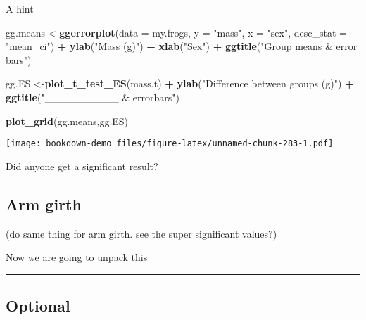 \documentclass[]{book}
\newenvironment{Shaded}{\begin{snugshade}}{\end{snugshade}}
\newcommand{\KeywordTok}[1]{\textcolor[rgb]{0.13,0.29,0.53}{\textbf{#1}}}
\newcommand{\DataTypeTok}[1]{\textcolor[rgb]{0.13,0.29,0.53}{#1}}
\newcommand{\StringTok}[1]{\textcolor[rgb]{0.31,0.60,0.02}{#1}}
\newcommand{\OperatorTok}[1]{\textcolor[rgb]{0.81,0.36,0.00}{\textbf{#1}}}
\newcommand{\NormalTok}[1]{#1}
\theoremstyle{definition}
\theoremstyle{definition}
\theoremstyle{definition}
\theoremstyle{remark}
\begin{document}
A hint

\begin{Shaded}
\begin{Highlighting}[]
\NormalTok{gg.means <-}\KeywordTok{ggerrorplot}\NormalTok{(}\DataTypeTok{data =}\NormalTok{ my.frogs,}
          \DataTypeTok{y =} \StringTok{"mass"}\NormalTok{,}
          \DataTypeTok{x =} \StringTok{"sex"}\NormalTok{,}
          \DataTypeTok{desc_stat =} \StringTok{"mean_ci"}\NormalTok{) }\OperatorTok{+}
\StringTok{  }\KeywordTok{ylab}\NormalTok{(}\StringTok{"Mass (g)"}\NormalTok{) }\OperatorTok{+}
\StringTok{  }\KeywordTok{xlab}\NormalTok{(}\StringTok{"Sex"}\NormalTok{) }\OperatorTok{+}
\StringTok{  }\KeywordTok{ggtitle}\NormalTok{(}\StringTok{"Group means & error bars"}\NormalTok{)}


\NormalTok{gg.ES <-}\KeywordTok{plot_t_test_ES}\NormalTok{(mass.t) }\OperatorTok{+}
\StringTok{  }\KeywordTok{ylab}\NormalTok{(}\StringTok{"Difference between groups (g)"}\NormalTok{) }\OperatorTok{+}
\StringTok{  }\KeywordTok{ggtitle}\NormalTok{(}\StringTok{"__________ & errorbars"}\NormalTok{)}
\end{Highlighting}
\end{Shaded}

\begin{Shaded}
\begin{Highlighting}[]
\KeywordTok{plot_grid}\NormalTok{(gg.means,gg.ES)}
\end{Highlighting}
\end{Shaded}

\texttt{[image: bookdown-demo\_files/figure-latex/unnamed-chunk-283-1.pdf]}

Did anyone get a significant result?

\subsection{Arm girth}\label{arm-girth}

(do same thing for arm girth. see the super significant values?)

Now we are going to unpack this

\begin{center}\rule{0.5\linewidth}{\linethickness}\end{center}

\subsection{Optional}\label{optional-2}
\end{document}
